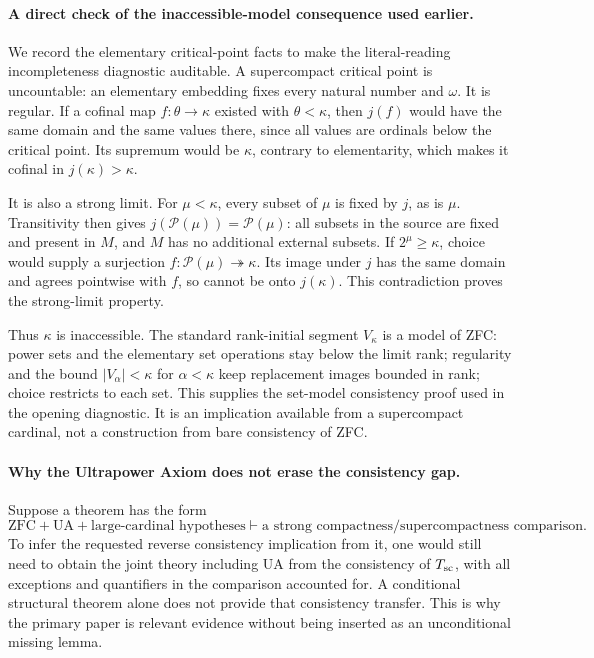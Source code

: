 \documentclass[11pt]{article}
\begin{document}
\paragraph{A direct check of the inaccessible-model consequence used earlier.}
We record the elementary critical-point facts to make the literal-reading
incompleteness diagnostic auditable. A supercompact critical point is
uncountable: an elementary embedding fixes every natural number and
$\omega$. It is regular. If a cofinal map $f:\theta\to\kappa$
existed with $\theta<\kappa$, then $j(f)$ would have the same domain
and the same values there, since all values are ordinals below the
critical point. Its supremum would be $\kappa$, contrary to elementarity,
which makes it cofinal in $j(\kappa)>\kappa$.

It is also a strong limit. For $\mu<\kappa$, every subset of $\mu$
is fixed by $j$, as is $\mu$. Transitivity then gives
$j(\mathcal P(\mu))=\mathcal P(\mu)$: all subsets in the source
are fixed and present in $M$, and $M$ has no additional external subsets.
If $2^\mu\ge\kappa$, choice would supply a surjection
$f:\mathcal P(\mu)\twoheadrightarrow\kappa$. Its image under $j$
has the same domain and agrees pointwise with $f$, so cannot be onto
$j(\kappa)$. This contradiction proves the strong-limit property.

Thus $\kappa$ is inaccessible. The standard rank-initial segment
$V_\kappa$ is a model of ZFC: power sets and the elementary set operations
stay below the limit rank; regularity and the bound $|V_\alpha|<\kappa$
for $\alpha<\kappa$ keep replacement images bounded in rank; choice
restricts to each set. This supplies the set-model consistency proof
used in the opening diagnostic. It is an implication available from a
supercompact cardinal, not a construction from bare consistency of ZFC.

\paragraph{Why the Ultrapower Axiom does not erase the consistency gap.}
Suppose a theorem has the form
\[
 \mathrm{ZFC}+\mathrm{UA}+\text{large-cardinal hypotheses}
       \vdash\text{a strong compactness/supercompactness comparison}.
\]
To infer the requested reverse consistency implication from it, one
would still need to obtain the joint theory including UA from the
consistency of $T_{\rm sc}$, with all exceptions and quantifiers in
the comparison accounted for. A conditional structural theorem alone
does not provide that consistency transfer. This is why the primary
paper is relevant evidence without being inserted as an unconditional
missing lemma.
\end{document}
